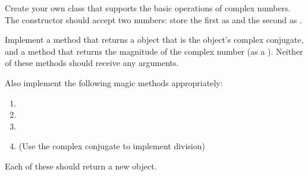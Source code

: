 \begin{problem}
Create your own  class that supports the basic operations of complex numbers.
The constructor should accept two numbers:
store the first as  and the second as .

Implement a  method that returns a  object that is the object's complex conjugate, and a  method that returns the magnitude of the complex number (as a ).
Neither of these methods should receive any arguments.

Also implement the following magic methods appropriately:
\begin{enumerate}
\item {}
\item {}
\item {}
\item {} (Use the complex conjugate to implement division)
\end{enumerate}
Each of these should return a new  object.

\end{problem}

